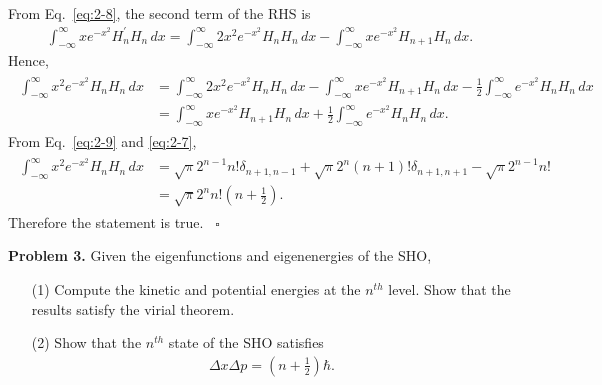 \documentclass[floatfix,nofootinbib,superscriptaddress,fleqn]{revtex4-2}
\begin{document}
\begin{itemize}
\begin{align}
\end{align}
From Eq.~\eqref{eq:2-8}, the second term of the RHS is
\begin{align}
  \int_{-\infty}^\infty xe^{-x^2}H_n^\prime H_n \,dx  
  =\int_{-\infty}^\infty 2x^2e^{-x^2}H_n H_n \,dx 
  -\int_{-\infty}^\infty xe^{-x^2}H_{n+1}H_n \,dx  .
\end{align}
Hence, 
\begin{align}
  \begin{split}
    \int_{-\infty}^\infty x^2e^{-x^2}H_nH_n \,dx  
    &=\int_{-\infty}^\infty 2x^2e^{-x^2}H_n H_n \,dx 
    -\int_{-\infty}^\infty xe^{-x^2}H_{n+1}H_n \,dx 
    -\frac{1}{2}\int_{-\infty}^\infty e^{-x^2}H_nH_n \,dx \\
    &=\int_{-\infty}^\infty xe^{-x^2}H_{n+1}H_n \,dx 
    +\frac{1}{2}\int_{-\infty}^\infty e^{-x^2}H_nH_n \,dx.
  \end{split}
\end{align}
From Eq.~\eqref{eq:2-9} and \eqref{eq:2-7},
\begin{align}\label{eq:2-10}
  \begin{split}
    \int_{-\infty}^\infty x^2e^{-x^2}H_nH_n \,dx  
    &=\sqrt{\pi}2^{n-1}n!\delta_{n+1,n-1}
    +\sqrt{\pi}2^{n}(n+1)!\delta_{n+1,n+1}
    -\sqrt{\pi}2^{n-1}n!  \\
    &=\sqrt{\pi}2^nn!\left(n+\frac{1}{2}\right).
  \end{split}
\end{align}
Therefore the statement is true. ~\hfill $\square$
\end{itemize}

\vspace{0.5cm}

\noindent \textbf{Problem 3.} 
Given the eigenfunctions and eigenenergies of the SHO, 
\begin{itemize}
\item[(1)] Compute the kinetic and potential energies at the $n^{th}$
  level.  Show that the results satisfy the virial theorem. 
\item[(2)] Show that the $n^{th}$ state of the SHO satisfies 
  \begin{align}
    \Delta x \Delta p = \left(n+\frac12\right)\hbar.
  \end{align}
\end{itemize}
\end{document}
